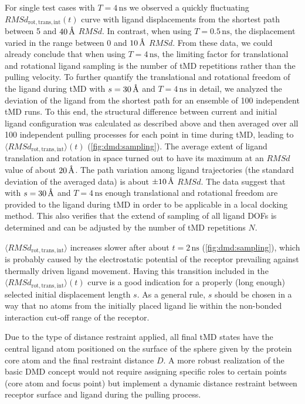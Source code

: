 For single test cases with $T=4\,\mathrm{ns}$ we observed a quickly fluctuating
$RMSd_{\mathrm{rot,trans,int}}(t)$ curve with ligand displacements from the
shortest path between 5 and $40\,\textup{\AA}$ $RMSd$. In contrast, when using
$T=0.5\,\mathrm{ns}$, the displacement varied in the range between 0 and
$10\,\textup{\AA}$ $RMSd$. From these data, we could already conclude that when
using $T=4\,\mathrm{ns}$, the limiting factor for translational and rotational
ligand sampling is the number of tMD repetitions rather than the pulling
velocity. To further quantify the translational and rotational freedom of the
ligand during tMD with $s=30\,\textup{\AA}$ and $T=4\,\mathrm{ns}$ in detail, we
analyzed the deviation of the ligand from the shortest path for an ensemble of
100 independent tMD runs. To this end, the structural difference between current
and initial ligand configuration was calculated as described above and then
averaged over all 100 independent pulling processes for each point in time
during tMD, leading to $\langle RMSd_{\mathrm{rot,trans,int}}\rangle(t)$
(\cref{fig:dmd:sampling}). The average extent of ligand translation and rotation
in space turned out to have its maximum at an $RMSd$ value of about
$20\,\textup{\AA}$. The path variation among ligand trajectories (the standard
deviation of the averaged data) is about $\pm10\,\textup{\AA}$ $RMSd$. The data
suggest that with $s=30\,\textup{\AA}$ and $T=4\,\mathrm{ns}$ enough translational
and rotational freedom are provided to the ligand during tMD in order to be
applicable in a local docking method. This also verifies that the extend of
sampling of all ligand DOFs is determined and can be adjusted by the number of
tMD repetitions $N$.

$\langle RMSd_{\mathrm{rot,trans,int}}\rangle$ increases slower after about
$t=2\,\mathrm{ns}$ (\cref{fig:dmd:sampling}), which is probably caused by the
electrostatic potential of the receptor prevailing against thermally driven
ligand movement. Having this transition included in the $\langle
RMSd_{\mathrm{rot,trans,int}}\rangle(t)$ curve is a good indication for a
properly (long enough) selected initial displacement length $s$. As a general
rule, $s$ should be chosen in a way that no atoms from the initially placed
ligand lie within the non-bonded interaction cut-off range of the receptor.

Due to the type of distance restraint applied, all final tMD states have the
central ligand atom positioned on the surface of the sphere given by the protein
core atom and the final restraint distance $D$. A more robust realization of the
basic DMD concept would not require assigning specific roles to certain points
(core atom and focus point) but implement a dynamic distance restraint between
receptor surface and ligand during the pulling process.

